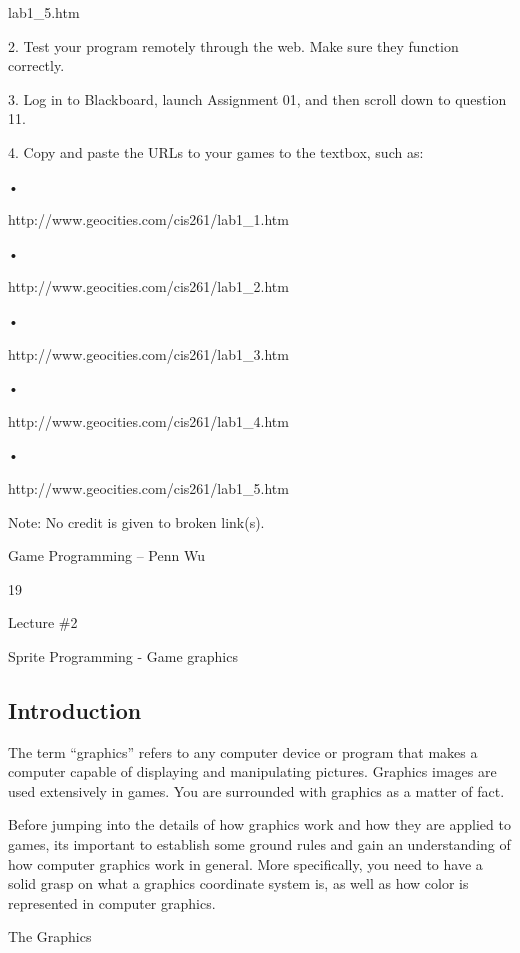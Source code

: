 \documentclass[
]{article}
\begin{document}
lab1\_5.htm

2. Test your program remotely through the web. Make sure they function
correctly.

3. Log in to Blackboard, launch Assignment 01, and then scroll down to
question 11.

4. Copy and paste the URLs to your games to the textbox, such as:

•

http://www.geocities.com/cis261/lab1\_1.htm

•

http://www.geocities.com/cis261/lab1\_2.htm

•

http://www.geocities.com/cis261/lab1\_3.htm

•

http://www.geocities.com/cis261/lab1\_4.htm

•

http://www.geocities.com/cis261/lab1\_5.htm

Note: No credit is given to broken link(s).

Game Programming -- Penn Wu

19

\protect\hypertarget{index_split_002.htmlux5cux23p20}{}{}

Lecture \#2

Sprite Programming - Game graphics

\protect\hypertarget{index_split_003.html}{}{}

\hypertarget{index_split_003.htmlux5cux23calibre_pb_2}{%
\subsection{Introduction}\label{index_split_003.htmlux5cux23calibre_pb_2}}

The term ``graphics'' refers to any computer device or program that
makes a computer capable of displaying and manipulating pictures.
Graphics images are used extensively in games. You are surrounded with
graphics as a matter of fact.

Before jumping into the details of how graphics work and how they are
applied to games, it\textquotesingle s important to establish some
ground rules and gain an understanding of how computer graphics work in
general. More specifically, you need to have a solid grasp on what a
graphics coordinate system is, as well as how color is represented in
computer graphics.

The Graphics
\end{document}

